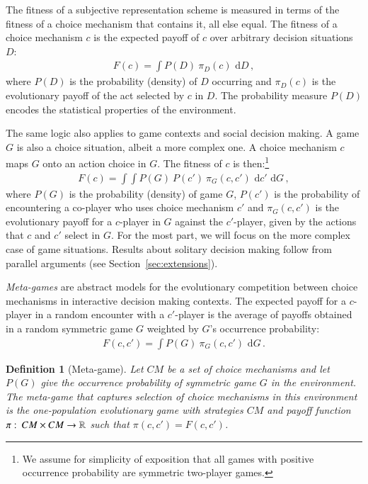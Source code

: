 \documentclass[fleqn,reqno,12pt]{article}
\theoremstyle{Satz}
\newtheorem{definition}[theorem]{Definition}
\theoremstyle{Bsp}
\newcommand{\mycolon}{\ensuremath{\thinspace \colon \thinspace}}
\begin{document}
The fitness of a subjective representation scheme is measured in terms of the fitness of a
choice mechanism that contains it, all else equal. The fitness of a choice mechanism $c$ is the
expected payoff of $c$ over arbitrary decision situations $D$:
\begin{align}
  \label{eq:FittnessChoiceMechSolitary}
  F(c) = \int P(D) \  \pi_D(c) \text{ d} D \,,
\end{align}
where $P(D)$ is the probability (density) of $D$ occurring and $\pi_D(c)$ is the evolutionary payoff of
the act selected by $c$ in $D$. The probability measure $P(D)$ encodes the statistical
properties of the environment.

The same logic also applies to game contexts and social decision making. A game $G$ is also a
choice situation, albeit a more complex one. A choice mechanism $c$ maps $G$ onto an action
choice in $G$. The fitness of $c$ is then:\footnote{We assume for simplicity of exposition that
  all games with positive occurrence probability are symmetric two-player games.}
\begin{align}
  \label{eq:FittnessChoiceMechGame}
  F(c) = \int \int P(G) \  P(c') \  \pi_G(c,c') \text{ d} c' \text{ d} G  \,,
\end{align}
where $P(G)$ is the probability (density) of game $G$, $P(c')$ is the probability of
encountering a co-player who uses choice mechanism $c'$ and $\pi_G(c,c')$ is the evolutionary payoff for
a $c$-player in $G$ against the $c'$-player, given by the actions that $c$
and $c'$ select in $G$. For the most part, we will focus on the more complex case of game situations. Results about solitary decision making follow from parallel arguments
(see Section~\ref{sec:extensions}).

\emph{Meta-games} are abstract models for the evolutionary competition between choice
mechanisms in interactive decision making contexts. The expected payoff for a $c$-player in a random
encounter with a $c'$-player is the average of payoffs obtained in a random symmetric game $G$ weighted
by $G$'s occurrence probability:
\begin{align}
  \label{eq:FittnessChoiceMechGamePairwise}
  F(c, c') = \int P(G) \  \pi_G(c,c') \text{ d} G \,.
\end{align}

\begin{definition}[Meta-game]
  \label{def:MetaGame}
  Let $CM$ be a set of choice mechanisms and let $P(G)$ give the occurrence probability of symmetric game
  $G$ in the environment. The meta-game that captures selection of choice mechanisms in this
  environment is the one-population evolutionary game with strategies $CM$ and payoff function
  $\pi \mycolon CM \times CM \rightarrow \mathbb{R}$ such that
  $\pi(c,c') = F(c,c')$.
\end{definition}
\end{document}
